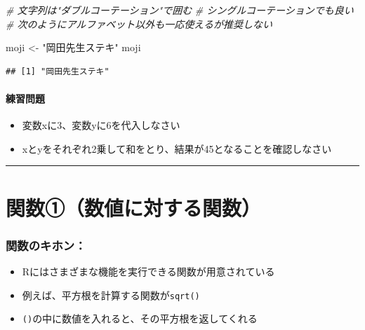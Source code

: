 \documentclass[
]{book}
\newenvironment{Shaded}{\begin{snugshade}}{\end{snugshade}}
\newcommand{\CommentTok}[1]{\textcolor[rgb]{0.56,0.35,0.01}{\textit{#1}}}
\newcommand{\NormalTok}[1]{#1}
\newcommand{\OtherTok}[1]{\textcolor[rgb]{0.56,0.35,0.01}{#1}}
\newcommand{\StringTok}[1]{\textcolor[rgb]{0.31,0.60,0.02}{#1}}
\providecommand{\tightlist}{%
  \setlength{\itemsep}{0pt}\setlength{\parskip}{0pt}}
\begin{document}
\begin{Shaded}
\begin{Highlighting}[]
\CommentTok{\# 文字列は"ダブルコーテーション"で囲む}
\CommentTok{\# \textquotesingle{}シングルコーテーション\textquotesingle{}でも良い}
\CommentTok{\# 次のようにアルファベット以外も一応使えるが推奨しない}

\NormalTok{moji }\OtherTok{\textless{}{-}} \StringTok{"岡田先生ステキ"}
\NormalTok{moji}
\end{Highlighting}
\end{Shaded}

\begin{verbatim}
## [1] "岡田先生ステキ"
\end{verbatim}

\hypertarget{ux7df4ux7fd2ux554fux984c}{%
\paragraph*{練習問題}\label{ux7df4ux7fd2ux554fux984c}}

\begin{itemize}
\tightlist
\item
  変数xに3、変数yに6を代入しなさい\\
\item
  xとyをそれぞれ2乗して和をとり、結果が45となることを確認しなさい
\end{itemize}

\begin{center}\rule{0.5\linewidth}{0.5pt}\end{center}

\hypertarget{ux95a2ux6570ux2460ux6570ux5024ux306bux5bfeux3059ux308bux95a2ux6570}{%
\section{関数①（数値に対する関数）}\label{ux95a2ux6570ux2460ux6570ux5024ux306bux5bfeux3059ux308bux95a2ux6570}}

\hypertarget{ux95a2ux6570ux306eux30adux30dbux30f3}{%
\subsubsection*{関数のキホン：}\label{ux95a2ux6570ux306eux30adux30dbux30f3}}

\begin{itemize}
\tightlist
\item
  Rにはさまざまな機能を実行できる関数が用意されている
\item
  例えば、平方根を計算する関数が\texttt{sqrt()}
\item
  \texttt{()}の中に数値を入れると、その平方根を返してくれる
\end{itemize}
\end{document}

